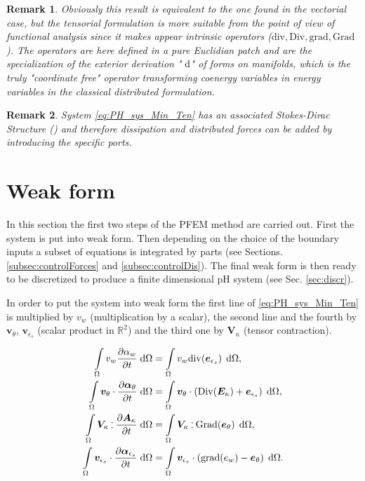 \documentclass{ifacconf}
\newtheorem{remark}{Remark}
\def\onedot{$\mathsurround0pt\ldotp$}
\def\cddot{%
	\mathbin{\vcenter{\baselineskip.67ex
			\hbox{\onedot}\hbox{\onedot}}%
}}
\begin{document}
\begin{remark}
	Obviously this result is equivalent to the one found in the vectorial case, but the tensorial formulation is more suitable from the point of view of functional analysis since it makes appear intrinsic operators ($\mathrm{div}, \mathrm{Div}, \mathrm{grad}, \mathrm{Grad}$). The operators are here defined in a pure Euclidian patch and are the specialization of the exterior derivation "$\d$" of forms on manifolds, which is
	the truly "coordinate free" operator transforming coenergy
	variables in energy variables in the classical distributed
	formulation.
\end{remark}

 \begin{remark}
System \eqref{eq:PH_sys_Min_Ten} has an associated Stokes-Dirac Structure (\cite{MacchelliMindlin}) and therefore dissipation and distributed forces can be added by introducing the specific ports.
 \end{remark}

\section{Weak form}
In this section the first two steps of the PFEM method are carried out. First the system is put into weak form. Then depending on the choice of the boundary inputs a subset of equations is integrated by parts (see Sections. \ref{subsec:controlForces} and \ref{subsec:controlDis}). The final weak form is then ready to be discretized to produce a finite dimensional pH system (see Sec. \ref{sec:discr}).

In order to put the system into weak form the first line of \eqref{eq:PH_sys_Min_Ten} is multiplied  by $v_w$ (multiplication by a scalar), the second line and the fourth by $\bm{v}_{\theta}$, $\bm{v}_{\epsilon_s}$ (scalar product in $\mathbb{R}^2$) and the third one by $\bm{V}_{\kappa}$ (tensor contraction).

\begin{align}
\int_{\Omega} v_w \diffp{\alpha_w}{t}  \d\Omega &=  \int_{\Omega} v_w \mathrm{div}(\bm{e}_{\epsilon_s}) \, \d\Omega,  \label{eq:wf1_min_ten}\\
\int_{\Omega} \bm{v}_{\theta} \cdot \diffp{\bm\alpha_{\theta}}{t}   \d\Omega &= \int_{\Omega} \bm{v}_{\theta} \cdot (\mathrm{Div}( \bm{E}_{\kappa}) + \bm{e}_{\epsilon_s}) \,  \d\Omega,  \label{eq:wf2_min_ten} \\
\int_{\Omega} \bm{V}_{\kappa} \cddot \diffp{\bm{A}_{\kappa}}{t}   \d\Omega &= \int_{\Omega} \bm{V}_{\kappa} \cddot \mathrm{Grad}(\bm{e}_\theta) \, \d\Omega, \label{eq:wf3_min_ten} \\
\int_{\Omega} \bm{v}_{\epsilon_s} \cdot \diffp{\bm\alpha_{\epsilon_s}}{t}   \d\Omega &= \int_{\Omega} \bm{v}_{\epsilon_s} \cdot (\mathrm{grad}({e}_{w}) - \bm{e}_{\theta}) \, \d\Omega.  \label{eq:wf4_min_ten}
\end{align}
\end{document}
